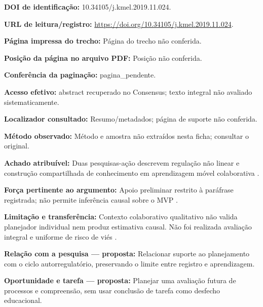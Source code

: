 \noindent\textbf{DOI de identificação:} 10.34105/j.kmel.2019.11.024.\par\medskip

\noindent\textbf{URL de leitura/registro:} \url{https://doi.org/10.34105/j.kmel.2019.11.024}.\par\medskip

\noindent\textbf{Página impressa do trecho:} Página do trecho não conferida.\par\medskip

\noindent\textbf{Posição da página no arquivo PDF:} Posição não conferida.\par\medskip

\noindent\textbf{Conferência da paginação:} pagina\_pendente.\par\medskip

\noindent\textbf{Acesso efetivo:} abstract recuperado no Consensus; texto integral não avaliado sistematicamente.\par\medskip

\noindent\textbf{Localizador consultado:} Resumo/metadados; página de suporte não conferida.\par\medskip

\noindent\textbf{Método observado:} Método e amostra não extraídos nesta ficha; consultar o original.\par\medskip

\noindent\textbf{Achado atribuível:} Duas pesquisas-ação descrevem regulação não linear e construção compartilhada de conhecimento em aprendizagem móvel colaborativa \citep{education_lim2019}.\par\medskip

\noindent\textbf{Força pertinente ao argumento:} Apoio preliminar restrito à paráfrase registrada; não permite inferência causal sobre o MVP \citep{education_lim2019}.\par\medskip

\noindent\textbf{Limitação e transferência:} Contexto colaborativo qualitativo não valida planejador individual nem produz estimativa causal. Não foi realizada avaliação integral e uniforme de risco de viés \citep{education_lim2019}.\par\medskip

\noindent\textbf{Relação com a pesquisa — proposta:} Relacionar suporte ao planejamento com o ciclo autorregulatório, preservando o limite entre registro e aprendizagem.\par\medskip

\noindent\textbf{Oportunidade e tarefa — proposta:} Planejar uma avaliação futura de processos e compreensão, sem usar conclusão de tarefa como desfecho educacional.\par\medskip

